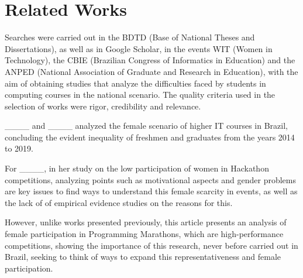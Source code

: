 \section{Related Works}
\label{sec:firstpage}

Searches were carried out in the BDTD (Base of National Theses and Dissertations), as well as in Google Scholar, in the events WIT (Women in Technology), the CBIE (Brazilian Congress of Informatics in Education) and the ANPED (National Association of Graduate and Research in Education), with the aim of obtaining studies that analyze the difficulties faced by students in computing courses in the national scenario. The quality criteria used in the selection of works were rigor, credibility and relevance.

____ and ____ analyzed the female scenario of higher IT courses in Brazil, concluding the evident inequality of freshmen and graduates from the years 2014 to 2019.

For ____, in her study on the low participation of women in Hackathon competitions, analyzing points such as motivational aspects and gender problems are key issues to find ways to understand this female scarcity in events, as well as the lack of of empirical evidence studies on the reasons for this.

However, unlike works presented previously, this article presents an analysis of female participation in Programming Marathons, which are high-performance competitions, showing the importance of this research, never before carried out in Brazil, seeking to think of ways to expand this representativeness and female participation.